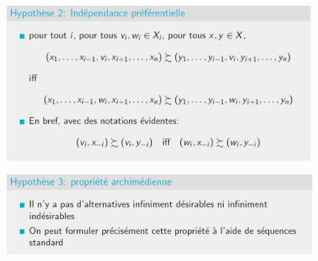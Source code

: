 \documentclass[a4paper, 12pt]{article}
\begin{document}
			\begin{center}
				\includegraphics[width=4.5in]{Images/independance}
			\end{center}
			\begin{center}
				\includegraphics[width=4.5in]{Images/archimedienne}
			\end{center}
		\pagebreak
\end{document}
